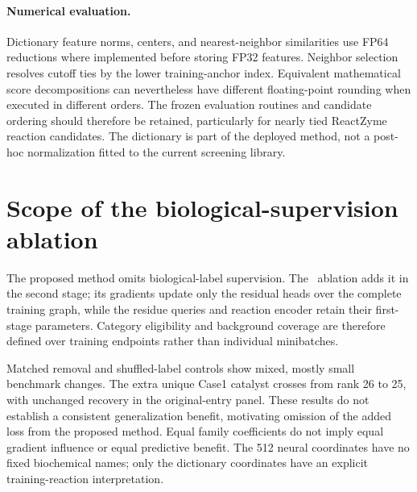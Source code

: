 \paragraph{Numerical evaluation.}
Dictionary feature norms, centers, and nearest-neighbor similarities use
FP64 reductions where implemented before storing FP32 features. Neighbor
selection resolves cutoff ties by the lower training-anchor index.
Equivalent mathematical score decompositions can nevertheless have different
floating-point rounding when executed in different orders. The frozen
evaluation routines and candidate ordering should therefore be retained,
particularly for nearly tied ReactZyme reaction candidates. The dictionary
is part of the deployed method, not a post-hoc normalization fitted to the
current screening library.

\section{Scope of the biological-supervision ablation}
\label{app:v4-scope}
The proposed method omits biological-label supervision. The \vfourBio\
ablation adds it in the second stage; its gradients update only the residual
heads over the complete training graph,
while the residue queries and reaction encoder retain their first-stage
parameters. Category eligibility and background coverage are therefore
defined over training endpoints rather than individual minibatches.

Matched removal and shuffled-label controls show mixed, mostly small
benchmark changes. The extra unique Case1 catalyst crosses from rank 26
to 25, with unchanged recovery in the original-entry panel. These results
do not establish a consistent generalization benefit, motivating omission
of the added loss from the proposed method. Equal family coefficients do
not imply equal gradient influence or equal predictive benefit.
The 512 neural coordinates have no fixed
biochemical names; only the dictionary coordinates have an explicit
training-reaction interpretation.
